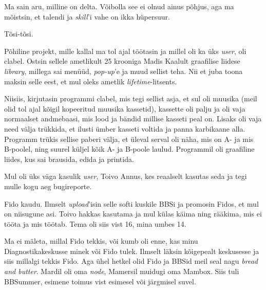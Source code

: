 
Ma sain aru, milline on delta. Võibolla see ei olnud ainus põhjus, aga 
ma mõistsin, et talendi ja \emph{skill}'i vahe on ikka 
hüpersuur.


Tõsi-tõsi.

Põhiline projekt, mille kallal ma tol ajal töötasin ja millel oli ka üks 
\emph{user}, oli clabel. Ostsin sellele
ametlikult 25 krooniga Madis Kaalult graafilise 
liidese \emph{library}, millega sai menüüd, \emph{pop-up}'e ja muud sellist
teha. Nii et juba toona 
maksin selle eest, et mul oleks ametlik \emph{lifetime}-litsents. 

Niisiis, kirjutasin programmi clabel, mis tegi sellist 
asja, et sul oli muusika (meil olid tol ajal kõigil kopeeritud muusika 
kassetid), kassette oli palju ja oli vaja normaalset andmebaasi,
mis lood ja bändid millise kasseti peal on. Lisaks oli vaja need 
välja trükkida, et ilusti ümber kasseti voltida 
ja panna karbikaane alla. Programm trükis sellise paberi välja, et üleval serval 
oli näha, mis on A- ja mis B-poolel, ning suurel küljel kõik
A- ja B-poole laulud. Programmil oli graafiline liides, kus 
sai brausida, edida ja printida. 


Mul oli üks väga kasulik \emph{user}, Toivo Annus, kes reaalselt kasutas seda ja tegi mulle 
kogu aeg bugireporte.


Fido kaudu. Ilmselt \emph{upload}'isin selle softi kuskile BBSi ja promosin Fidos, et mul on niisugune asi. Toivo hakkas kasutama ja mul külas 
käima ning rääkima, mis ei tööta ja mis töötab. Tema oli siis vist 16, mina 
umbes 14. 


Ma ei mäleta, millal Fido tekkis, või kumb oli enne, kas minu Diagnostikakeskusse minek või Fido tulek. Ilmselt 
läksin kõigepealt keskusesse ja siis millalgi tekkis Fido. Aga ühel hetkel olid Fido ja BBSid meil seal 
nagu \emph{bread and butter}. Mardil oli oma 
\emph{node}, Mamersil muidugi oma Mambox. 
Siis tuli BBSummer, esimene toimus vist esimesel või 
järgmisel suvel. 

